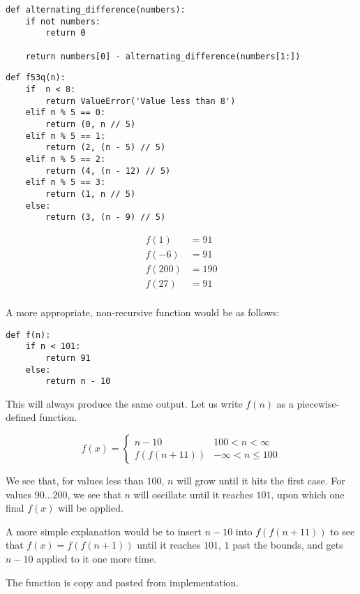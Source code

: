 \documentclass[12pt]{scrartcl}
\begin{document}
\problem{}


\begin{lstlisting}
def alternating_difference(numbers):
    if not numbers:
        return 0

    return numbers[0] - alternating_difference(numbers[1:])
\end{lstlisting}

\problem{}
\begin{lstlisting}
def f53q(n):
    if  n < 8:
        return ValueError('Value less than 8')
    elif n % 5 == 0:
        return (0, n // 5)
    elif n % 5 == 1:
        return (2, (n - 5) // 5)
    elif n % 5 == 2:
        return (4, (n - 12) // 5)
    elif n % 5 == 3:
        return (1, n // 5)
    else:
        return (3, (n - 9) // 5)
\end{lstlisting}

\problem{}
\begin{align*}
    f(1) &= 91 \\
    f(-6) &= 91 \\
    f(200) &= 190 \\
    f(27) &= 91 \\
\end{align*}

A more appropriate, non-recursive function would be as follows:

\begin{lstlisting}
def f(n):
    if n < 101:
        return 91
    else:
        return n - 10
\end{lstlisting}

This will always produce the same output. Let us write $f(n)$ as a piecewise-defined function.

\[ f(x) =
    \begin{cases}
        n - 10 & 100 < n < \infty \\
        f(f(n + 11)) & -\infty < n \leq 100
    \end{cases}
\]

We see that, for values less than $100$, $n$ will grow until it hits the first case. For values $90\ldots200$, we see that $n$ will oscillate until it reaches $101$, upon which one final $f(x)$ will be applied.

A more simple explanation would be to insert $n - 10$ into $f(f(n + 11))$ to see that $f(x) = f(f(n+1))$ until it reaches $101$, $1$ past the bounds, and gets $n - 10$ applied to it one more time.

\problem{}
The function is copy and pasted from implementation.
\end{document}
